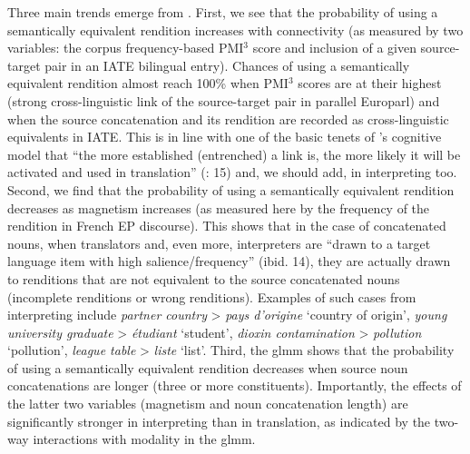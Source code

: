 \documentclass[output=paper]{langscibook}
\begin{document}
Three main trends emerge from . First, we see that the probability of using a semantically equivalent rendition increases with connectivity (as measured by two variables: the corpus frequency-based PMI$^3$ score and inclusion of a given source-target pair in an IATE bilingual entry). Chances of using a semantically equivalent rendition almost reach 100\% when PMI$^3$ scores are at their highest (strong cross-linguistic link of the source-target pair in parallel Europarl) and when the source concatenation and its rendition are recorded as cross-linguistic equivalents in IATE. This is in line with one of the basic tenets of \citeauthor{Halverson2017}’s cognitive model that “the more established (entrenched) a link is, the more likely it will be activated and used in translation” (\citeyear{Halverson2017}: 15) and, we should add, in interpreting too. Second, we find that the probability of using a semantically equivalent rendition decreases as magnetism increases (as measured here by the frequency of the rendition in French EP discourse). This shows that in the case of concatenated nouns, when translators and, even more, interpreters are “drawn to a target language item with high salience/frequency” (ibid. 14), they are actually drawn to renditions that are not equivalent to the source concatenated nouns (incomplete renditions or wrong renditions). Examples of such cases from interpreting include \textit{partner country} > \textit{pays d’origine} ‘country of origin’, \textit{young university graduate} > \textit{étudiant} ‘student’, \textit{dioxin contamination} > \textit{pollution} ‘pollution’, \textit{league table} > \textit{liste} ‘list’. Third, the glmm shows that the probability of using a semantically equivalent rendition decreases when source noun concatenations are longer (three or more constituents). Importantly, the effects of the latter two variables (magnetism and noun concatenation length) are significantly stronger in interpreting than in translation, as indicated by the two-way interactions with modality in the glmm.
\end{document}
